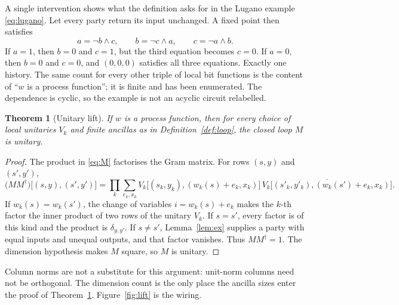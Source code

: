 \documentclass[11pt]{article}
\newtheorem{theorem}{Theorem}
\theoremstyle{definition}
\theoremstyle{remark}
\begin{document}
A single intervention shows what the definition asks for in the Lugano example \eqref{eq:lugano}. Let every party return its input unchanged. A fixed point then satisfies
\[
a=\lnot b\land c,\qquad b=\lnot c\land a,\qquad c=\lnot a\land b.
\]
If \(a=1\), then \(b=0\) and \(c=1\), but the third equation becomes \(c=0\). If \(a=0\), then \(b=0\) and \(c=0\), and \((0,0,0)\) satisfies all three equations. Exactly one history. The same count for every other triple of local bit functions is the content of ``\(w\) is a process function''; it is finite and has been enumerated. The dependence is cyclic, so the example is not an acyclic circuit relabelled.

\begin{theorem}[Unitary lift]
\label{thm:lift}
If \(w\) is a process function, then for every choice of local unitaries \(V_k\) and finite ancillas as in Definition~\ref{def:loop}, the closed loop \(M\) is unitary.
\end{theorem}

\begin{proof}
The product in \eqref{eq:M} factorises the Gram matrix. For rows \((s,y)\) and \((s',y')\),
\begin{equation}
\label{eq:gram}
\bigl(MM^{\dagger}\bigr)\bigl[(s,y),(s',y')\bigr]
=\prod_k\sum_{e_k,x_k}
V_k\bigl[(s_k,y_k),(w_k(s)+e_k,x_k)\bigr]\,
\overline{V_k\bigl[(s'_k,y'_k),(w_k(s')+e_k,x_k)\bigr]}.
\end{equation}
If \(w_k(s)=w_k(s')\), the change of variables \(i=w_k(s)+e_k\) makes the \(k\)-th factor the inner product of two rows of the unitary \(V_k\). If \(s=s'\), every factor is of this kind and the product is \(\delta_{y,y'}\). If \(s\neq s'\), Lemma~\ref{lem:ex} supplies a party with equal inputs and unequal outputs, and that factor vanishes. Thus \(MM^{\dagger}=1\). The dimension hypothesis makes \(M\) square, so \(M\) is unitary.
\end{proof}

Column norms are not a substitute for this argument: unit-norm columns need not be orthogonal. The dimension count is the only place the ancilla sizes enter the proof of Theorem~\ref{thm:lift}. Figure~\ref{fig:lift} is the wiring.
\end{document}
